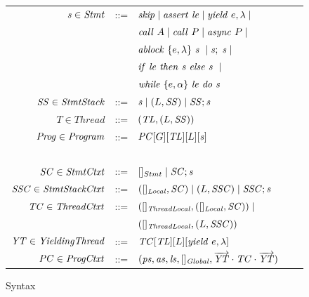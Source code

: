 \begin{figure}
\setlength{\tabcolsep}{3pt}
\begin{tabular}{rclcl}
$\mathit{s} \in \mathit{Stmt}$ &::= & $\mathit{skip} \mid \mathit{assert}\ \mathit{le} \mid \mathit{yield}\ e,\lambda \mid$ \\
                  & & $\mathit{call}\ A \mid \mathit{call}\ P \mid \mathit{async}\ P \mid $\\
                  & & $\mathit{ablock}\ {\{e,\lambda\}}\ {\mathit{s}}\  \mid \mathit{s};\;\mathit{s} \mid$\\
                  & & ${\mathit{if}\ {\mathit{le}}\ }{\mathit{then}\ {\mathit{s}}\ }{\mathit{else}\ {\mathit{s}}\ } \mid$ \\
                  & & $\mathit{while}\ \{{e,\alpha}\}\ {{\mathit{le}}\ } \mathit{do}\ {{\mathit{s}}\ }$ \\ 
$\mathit{SS} \in \mathit{StmtStack}$ &::= & $\mathit{s} \mid (L,\mathit{SS}) \mid \mathit{SS};\mathit{s}$ \\
$T \in \mathit{Thread}$ &::= &$(\mathit{TL}, (L, \mathit{SS}))$ \\
$\mathit{Prog} \in \mathit{Program}$ &::= & $\mathit{PC}[G][\mathit{TL}][L][\mathit{s}]$ \\
~\\
$\mathit{SC} \in \mathit{StmtCtxt}$ &::= &$[]_{Stmt} \mid \mathit{SC};\mathit{s}$ \\
$\mathit{SSC} \in \mathit{StmtStackCtxt}$ &::= & $([]_{\mathit{Local}}, \mathit{SC}) \mid (L,\mathit{SSC}) \mid \mathit{SSC};\mathit{s}$ \\
$\mathit{TC} \in \mathit{ThreadCtxt}$ &::= &$([]_{\mathit{ThreadLocal}}, ([]_{\mathit{Local}}, \mathit{SC})) \mid$ \\
 & &$([]_{\mathit{ThreadLocal}}, (L, \mathit{SSC}))$ \\
$\mathit{YT} \in \mathit{YieldingThread}$ &::= &$\mathit{TC}[\mathit{TL}][L][\mathit{yield}\ e,\lambda]$ \\
$\mathit{PC} \in \mathit{ProgCtxt}$ &::= & $(\mathit{ps}, \mathit{as}, \mathit{ls}, []_{\mathit{Global}}, \overrightarrow{\mathit{YT}} \cdot \mathit{TC} \cdot \overrightarrow{\mathit{YT}})$
\end{tabular}
\caption{Syntax}
\label{fig:syntax}
\end{figure}

